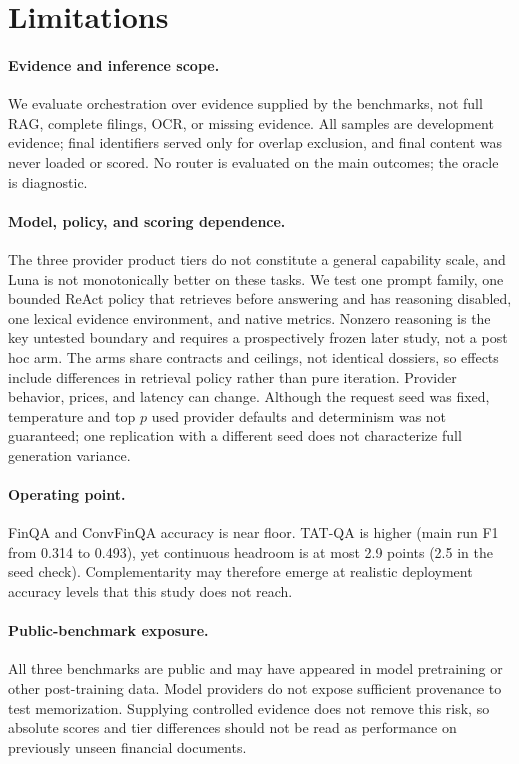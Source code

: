 \section*{Limitations}

\paragraph{Evidence and inference scope.}
We evaluate orchestration over evidence supplied by the benchmarks, not full RAG,
complete filings, OCR, or missing evidence. All samples are development
evidence; final identifiers served only for overlap exclusion, and final
content was never loaded or scored. No router is evaluated on the main
outcomes; the oracle is diagnostic.

\paragraph{Model, policy, and scoring dependence.}
The three provider product tiers do not constitute a general capability scale,
and Luna is not monotonically better on these tasks. We test one prompt family,
one bounded ReAct policy that retrieves before answering and has reasoning
disabled, one lexical
evidence environment, and native metrics. Nonzero reasoning is the key untested
boundary and requires a prospectively frozen later study, not a post hoc arm. The
arms share contracts and ceilings, not identical dossiers, so effects include
differences in retrieval policy rather than pure iteration. Provider behavior,
prices, and latency can change. Although the request seed was fixed,
temperature and top $p$ used provider defaults and determinism was not
guaranteed; one replication with a different seed does not characterize full
generation variance.

\paragraph{Operating point.}
FinQA and ConvFinQA accuracy is near floor. TAT-QA is higher (main run F1
from 0.314 to 0.493), yet continuous headroom is at most 2.9 points (2.5 in the seed
check). Complementarity may therefore emerge at realistic deployment accuracy
levels that this study does not reach.

\paragraph{Public-benchmark exposure.}
All three benchmarks are public and may have appeared in model pretraining or
other post-training data. Model providers do not expose sufficient provenance
to test memorization. Supplying controlled evidence does not remove this risk,
so absolute scores and tier differences should not be read as performance on
previously unseen financial documents.
